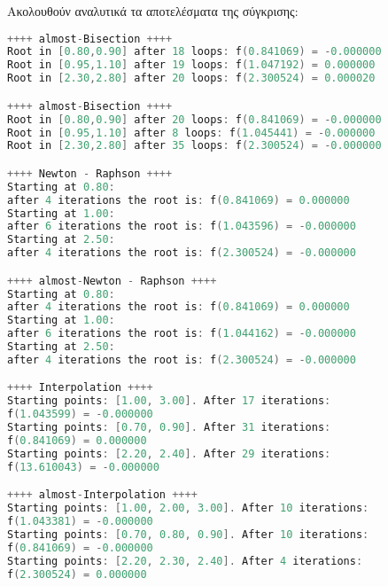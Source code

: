 Ακολουθούν αναλυτικά τα αποτελέσματα της σύγκρισης:
\begin{lstlisting}[language=C, mathescape=true]
++++ almost-Bisection ++++
Root in [0.80,0.90] after 18 loops: f(0.841069) = -0.000000
Root in [0.95,1.10] after 19 loops: f(1.047192) = 0.000000
Root in [2.30,2.80] after 20 loops: f(2.300524) = 0.000020

++++ almost-Bisection ++++
Root in [0.80,0.90] after 20 loops: f(0.841069) = -0.000000
Root in [0.95,1.10] after 8 loops: f(1.045441) = -0.000000
Root in [2.30,2.80] after 35 loops: f(2.300524) = -0.000000

++++ Newton - Raphson ++++
Starting at 0.80:
after 4 iterations the root is: f(0.841069) = 0.000000
Starting at 1.00:
after 6 iterations the root is: f(1.043596) = -0.000000
Starting at 2.50:
after 4 iterations the root is: f(2.300524) = -0.000000

++++ almost-Newton - Raphson ++++
Starting at 0.80:
after 4 iterations the root is: f(0.841069) = 0.000000
Starting at 1.00:
after 6 iterations the root is: f(1.044162) = -0.000000
Starting at 2.50:
after 4 iterations the root is: f(2.300524) = -0.000000

++++ Interpolation ++++
Starting points: [1.00, 3.00]. After 17 iterations:
f(1.043599) = -0.000000
Starting points: [0.70, 0.90]. After 31 iterations:
f(0.841069) = 0.000000
Starting points: [2.20, 2.40]. After 29 iterations:
f(13.610043) = -0.000000

++++ almost-Interpolation ++++
Starting points: [1.00, 2.00, 3.00]. After 10 iterations:
f(1.043381) = -0.000000
Starting points: [0.70, 0.80, 0.90]. After 10 iterations:
f(0.841069) = -0.000000
Starting points: [2.20, 2.30, 2.40]. After 4 iterations:
f(2.300524) = 0.000000
\end{lstlisting}

